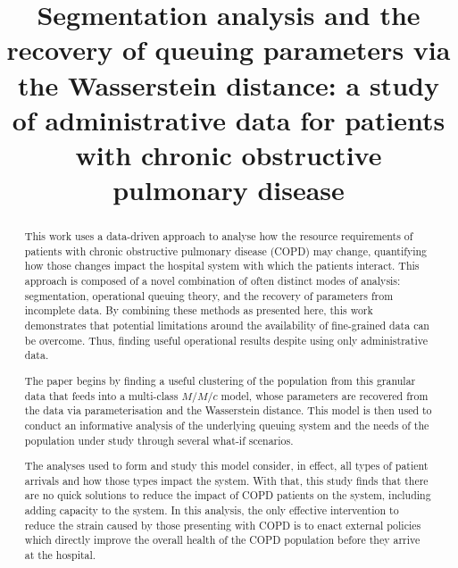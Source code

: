 \documentclass[]{interact}
\theoremstyle{plain}%
\theoremstyle{definition}
\theoremstyle{remark}
\begin{document}

\title{%
  Segmentation analysis and the recovery of queuing parameters via the
  Wasserstein distance: a study of administrative data for patients with chronic
  obstructive pulmonary disease
}

\author{%
}

\maketitle

\begin{abstract}
This work uses a data-driven approach to analyse how the resource requirements
of patients with chronic obstructive pulmonary disease (COPD) may change,
quantifying how those changes impact the hospital system with which the patients
interact. This approach is composed of a novel combination of often distinct
modes of analysis: segmentation, operational queuing theory, and the recovery of
parameters from incomplete data. By combining these methods as presented here,
this work demonstrates that potential limitations around the availability of
fine-grained data can be overcome. Thus, finding useful operational results
despite using only administrative data.

The paper begins by finding a useful clustering of the population from this
granular data that feeds into a multi-class \(M/M/c\) model, whose parameters
are recovered from the data via parameterisation and the Wasserstein distance.
This model is then used to conduct an informative analysis of the underlying
queuing system and the needs of the population under study through several
what-if scenarios.

The analyses used to form and study this model consider, in effect, all types of
patient arrivals and how those types impact the system. With that, this study
finds that there are no quick solutions to reduce the impact of COPD patients on
the system, including adding capacity to the system. In this analysis, the only
effective intervention to reduce the strain caused by those presenting with COPD
is to enact external policies which directly improve the overall health of the
COPD population before they arrive at the hospital.
\end{abstract}
\end{document}
